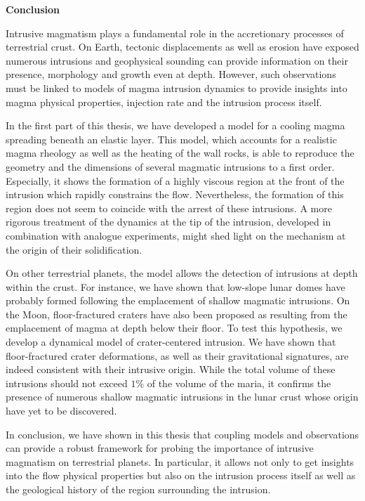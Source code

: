 \thispagestyle{plain}
\begin{center}
 \Large \vspace{.5cm} \textbf{Conclusion}
\end{center}

Intrusive  magmatism  plays a  fundamental  role  in the  accretionary
processes of  terrestrial crust.  On Earth,  tectonic displacements as
well  as  erosion have  exposed  numerous  intrusions and  geophysical
sounding  can provide  information on  their presence,  morphology and
growth even  at depth.  However,  such observations must be  linked to
models  of magma  intrusion dynamics  to provide  insights into  magma
physical properties, injection rate and the intrusion process itself.

In the  first part  of this thesis,  we have developed  a model  for a
cooling magma spreading  beneath an elastic layer.   This model, which
accounts for a realistic magma rheology  as well as the heating of the
wall rocks,  is able to reproduce  the geometry and the  dimensions of
several magmatic  intrusions to a  first order.  Especially,  it shows
the formation of a highly viscous region at the front of the intrusion
which  rapidly constrains  the flow.   Nevertheless, the  formation of
this  region does  not  seem  to coincide  with  the  arrest of  these
intrusions.  A more  rigorous treatment of the dynamics at  the tip of
the  intrusion, developed  in combination  with analogue  experiments,
might  shed   light  on   the  mechanism  at   the  origin   of  their
solidification.

On  other  terrestrial planets,  the  model  allows the  detection  of
intrusions at  depth within  the crust.  For  instance, we  have shown
that  low-slope  lunar  domes   have  probably  formed  following  the
emplacement   of   shallow   magmatic  intrusions.    On   the   Moon,
floor-fractured craters have also been  proposed as resulting from the
emplacement  of  magma at  depth  below  their  floor.  To  test  this
hypothesis, we develop a dynamical model of crater-centered intrusion.
We have  shown that  floor-fractured crater  deformations, as  well as
their  gravitational  signatures,  are indeed  consistent  with  their
intrusive origin.  While  the total volume of  these intrusions should
not exceed $1\%$ of the volume  of the maria, it confirms the presence
of  numerous shallow  magmatic  intrusions in  the  lunar crust  whose
origin have yet to be discovered.

In conclusion, we  have shown in this thesis that  coupling models and
observations can provide a robust framework for probing the importance
of  intrusive magmatism  on  terrestrial planets.   In particular,  it
allows not only to get insights  into the flow physical properties but
also on the intrusion process itself as well as the geological history
of the region surrounding the intrusion.


\newpage

